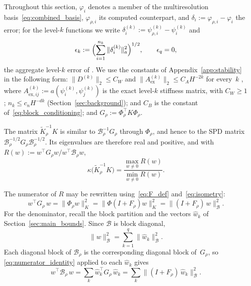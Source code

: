 \documentclass[hidelinks]{siamart}
\theoremstyle{nonumberplain}
\numberwithin{theorem}{section}
\begin{document}
Throughout this section, $\varphi_i$ denotes a member of the
multiresolution basis~\eqref{eq:combined_basis}, $\varphi_{\rho,i}$ its
computed counterpart, and $\delta_i := \varphi_{\rho,i} - \varphi_i$ the
error; for the level-$k$ functions we write
$\delta^{(k)}_i := \psi^{(k)}_{\rho,i} - \psi^{(k)}_i$ and
\begin{equation}\label{eq:eps_k_def}
  \epsilon_k := \Bigl( \sum_{i=1}^{n_k} \|\delta^{(k)}_i\|_a^2 \Bigr)^{1/2},
  \qquad \epsilon_q = 0,
\end{equation}
the aggregate level-$k$ error of \cite[Eq.~(16.113)]{Owhadi_Scovel_2019}.
We use the constants of Appendix~\ref{app:stability} in the following
form: $\|D^{(k)}\|_2 \leq C_W$ and $\|A^{(k)}_{\mathrm{ex}}\|_2 \leq C_A H^{-2k}$ for
every~$k$ \cite[Lemma~16.25, items 2 and 6]{Owhadi_Scovel_2019}, where
$A^{(k)}_{\mathrm{ex},ij} := a(\psi^{(k)}_i, \psi^{(k)}_j)$ is the exact level-$k$
stiffness matrix, with $C_W \geq 1$; $n_k \leq c_n H^{-dk}$
(Section~\ref{sec:background}); and $C_B$ is the constant
of~\eqref{eq:block_conditioning}; and $G_\rho := \Phi_\rho^\top K \Phi_\rho$.

The matrix $\widetilde{K}_\rho^{-1} K$ is similar to
$\mathcal{B}_\rho^{-1} G_\rho$ through $\Phi_\rho$, and hence to the SPD
matrix $\mathcal{B}_\rho^{-1/2} G_\rho \mathcal{B}_\rho^{-1/2}$.  Its
eigenvalues are therefore real and positive, and with
$R(w) := w^\top G_\rho w / w^\top \mathcal{B}_\rho w$,
\begin{equation}\label{eq:rayleigh}
  \kappa\bigl(\widetilde{K}_\rho^{-1} K\bigr)
  = \frac{\max_{w \neq 0} R(w)}{\min_{w \neq 0} R(w)} .
\end{equation}

The numerator of $R$ may be rewritten
using~\eqref{eq:F_def} and~\eqref{eq:isometry}:
\begin{equation}\label{eq:numerator_identity}
  w^\top G_\rho\, w = \|\Phi_\rho w\|_K^2
  = \|\Phi(I + F_\rho) w\|_K^2
  = \|(I + F_\rho)\, w\|_{\mathcal{B}}^2 .
\end{equation}
For the denominator, recall the block partition and the vectors
$\hat{w}_k$ of Section~\ref{sec:main_bounds}.  Since $\mathcal{B}$ is
block diagonal,
\begin{equation}\label{eq:slot_orthogonality}
  \|w\|_{\mathcal{B}}^2 = \sum_{k=1}^q \|\hat{w}_k\|_{\mathcal{B}}^2 .
\end{equation}
Each diagonal block of $\mathcal{B}_\rho$ is the corresponding diagonal block
of~$G_\rho$, so \eqref{eq:numerator_identity} applied to each
$\hat{w}_k$ gives
\begin{equation}\label{eq:denominator_identity}
  w^\top \mathcal{B}_\rho\, w
  = \sum_k \hat{w}_k^\top G_\rho\, \hat{w}_k
  = \sum_k \|(I + F_\rho)\, \hat{w}_k\|_{\mathcal{B}}^2 .
\end{equation}
\end{document}

